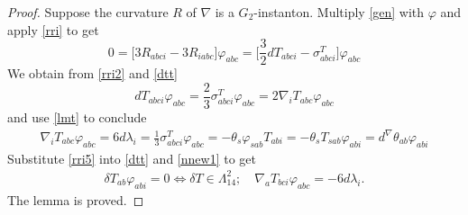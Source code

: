 \documentclass[10pt,a4paper]{amsart}
\def\p{{\varphi}}
\def\ph{{\Phi}}
\def\sb {{\nabla}}
\begin{document}
\begin{proof}
Suppose the curvature $R$ of $\sb$ is a $G_2$-instanton. %
Multiply \eqref{gen} with  $\p$ and  apply  \eqref{rri} to get
\begin{equation}\label{rri2}
0=\Big[3R_{abci}-3R_{iabc}\Big]\p_{abc}=\Big[\frac32dT_{abci}-\sigma^T_{abci}\Big]\p_{abc}
\end{equation}
We obtain from \eqref{rri2} and  \eqref{dtt} 
$$%
dT_{abci}\p_{abc}=\frac23\sigma^T_{abci}\p_{abc}=2\sb_iT_{abc}\p_{abc}
$$ %
and use \eqref{lmt} to conclude 
\begin{equation}\label{rri5}
\begin{split}
\sb_iT_{abc}\p_{abc}=6d\lambda_i=\frac13\sigma^T_{abci}\p_{abc}=-\theta_s\p_{sab}T_{abi}=-\theta_sT_{sab}\p_{abi}=d^{\sb}\theta_{ab}\p_{abi}%
\end{split}
\end{equation}
Substitute \eqref{rri5} into \eqref{dtt} and \eqref{nnew1} to get
\begin{equation}\label{rri6}
\begin{split}
\delta T_{ab}\p_{abi}=0 \Leftrightarrow \delta T\in\Lambda^2_{14};\quad \sb_aT_{bci}\p_{abc}=-6d\lambda_i.
\end{split}
\end{equation}
The lemma is proved.
\end{proof}
\end{document}
